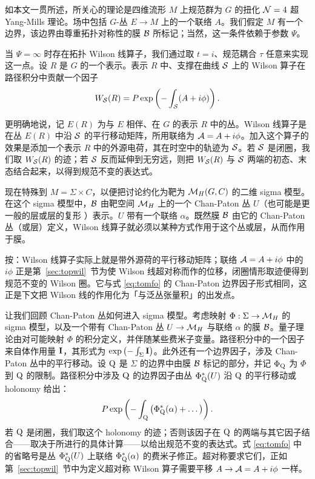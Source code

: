 \label{sec:wilbranes}

如本文一贯所述，所关心的理论是四维流形 $M$ 上规范群为 $G$ 的扭化 ${\cal N}=4$ 超 Yang-Mills 理论。场中包括 $G$-丛 $E\to M$ 上的一个联络 $A$。我们假定 $M$ 有一个边界，该边界由尊重拓扑对称性的膜 ${\cal B}$ 所标记；当然，这一条件依赖于参数 $\Psi$。

当 $\Psi=\infty$ 时存在拓扑 Wilson 线算子，我们通过取 $t=i$、规范耦合 $\tau$ 任意来实现这一点。设 $R$ 是 $G$ 的一个表示。表示 $R$ 中、支撑在曲线 ${\cal S}$ 上的 Wilson 算子在路径积分中贡献一个因子 %
\setcounter{equation}{0}
\begin{equation}\label{eq:yrgy}
W_{{\cal S}}(R)=P\exp\left(-\int_{{\cal S}}(A+i\phi)
 \right).
\end{equation}

更明确地说，记 $E(R)$ 为与 $E$ 相伴、在 $G$ 的表示 $R$ 中的丛。Wilson 线算子是在丛 $E(R)$ 中沿 ${\cal S}$ 的平行移动矩阵，所用联络为 $\CA=A+i\phi$。加入这个算子的效果是添加一个表示 $R$ 中的外源电荷，其在时空中的轨迹为 ${\cal S}$。若 ${\cal S}$ 是闭圈，我们取 $W_{{\cal S}}(R)$ 的迹；若 ${\cal S}$ 反而延伸到无穷远，则把 $W_{{\cal S}}(R)$ 与 ${\cal S}$ 两端的初态、末态结合起来，以得到规范不变的表达式。

现在特殊到 $M=\Sigma\times C$，以便把讨论约化为靶为 $\MH(G,C)$ 的二维 sigma 模型。
 在这个 sigma 模型中，${\cal B}$ 由靶空间 $\MH$ 上的一个 Chan-Paton 丛 $U$（也可能是更一般的层或层的复形 \cite{ref103,ref104}）表示。$U$ 带有一个联络 $\alpha$。既然膜 ${\cal B}$ 由它的 Chan-Paton 丛（或层）定义，Wilson 线算子就必须以某种方式作用于这个丛或层，从而作用于膜。

\begin{yizhu}[物理图像]
按：Wilson 线算子实际上就是带外源荷的平行移动矩阵；联络 $\CA=A+i\phi$ 中的 $i\phi$ 正是第~\ref{sec:topwil}~节为使 Wilson 线超对称而作的位移，闭圈情形取迹便得到规范不变的 Wilson 圈。它与式 \eqref{eq:tomfo} 的 Chan-Paton 边界因子形式相同，这正是下文把 Wilson 线的作用化为「与泛丛张量积」的出发点。
\end{yizhu}

让我们回顾 Chan-Paton 丛如何进入 sigma 模型。考虑映射 $\Phi:\Sigma\to \MH$ 的 sigma 模型，以及一个带有 Chan-Paton 丛 $U\to \MH$ 与联络 $\alpha$ 的膜 ${\cal B}$。量子理论由对可能映射 $\Phi$ 的积分定义，并伴随某些费米子变量。路径积分中的一个因子来自体作用量 ${\cmmib I}$，其形式为 $\exp\left(-\int_\Sigma {{\cmmib I}}\right)$。此外还有一个边界因子，涉及 Chan-Paton 丛中的平行移动。设 $\eurm Q$ 是 $\Sigma$ 的边界中由膜 ${\cal B}$ 标记的部分，并记 $\Phi_{\eurm Q}$ 为 $\Phi$ 到 $\eurm Q$ 的限制。路径积分中涉及 $\eurm Q$ 的边界因子由丛 $\Phi_{\eurm Q}^*(U)$ 沿 $\eurm Q$ 的平行移动或 holonomy 给出：
\setcounter{equation}{1}
\begin{equation}\label{eq:tomfo}
P\exp\left(-\int_{\eurm Q} \left(\Phi_{\eurm Q}^*(\alpha)
+\dots\right)\right).
\end{equation}
 若 $\eurm Q$ 是闭圈，我们取这个 holonomy 的迹；否则该因子在 $\eurm Q$ 的两端与其它因子结合——取决于所进行的具体计算——以给出规范不变的表达式。式 \eqref{eq:tomfo} 中的省略号是丛 $\Phi_{\eurm Q}^*(U)$ 上联络 $\Phi_{\eurm Q}^*(\alpha)$ 的费米子修正。超对称要求它们，正如第~\ref{sec:topwil}~节中为定义超对称 Wilson 算子需要平移 $A\to {\cal A}=A+i\phi$ 一样。

